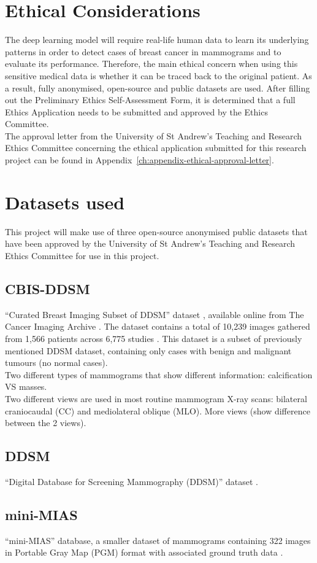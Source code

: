 \section{Ethical Considerations}

The deep learning model will require real-life human data to learn its underlying patterns in order to detect cases of breast cancer in mammograms and to evaluate its performance. Therefore, the main ethical concern when using this sensitive medical data is whether it can be traced back to the original patient. As a result, fully anonymised, open-source and public datasets are used. After filling out the Preliminary Ethics Self-Assessment Form, it is determined that a full Ethics Application needs to be submitted and approved by the Ethics Committee.\\

The approval letter from the University of St Andrew's Teaching and Research Ethics Committee concerning the ethical application submitted for this research project can be found in Appendix~\ref{ch:appendix-ethical-approval-letter}.


\section{Datasets used}

This project will make use of three open-source anonymised public datasets that have been approved by the University of St Andrew's Teaching and Research Ethics Committee for use in this project.

\subsection{CBIS-DDSM}

``Curated Breast Imaging Subset of DDSM'' dataset \cite{Lee2017}, available online from The Cancer Imaging Archive \cite{Clark2013}. The dataset contains a total of 10,239 images gathered from 1,566 patients across 6,775 studies \cite{Lee2017}. This dataset is a subset of previously mentioned DDSM dataset, containing only cases with benign and malignant tumours (no normal cases).\\

Two different types of mammograms that show different information: calcification VS masses.\\

Two different views are used in most routine mammogram X-ray scans: bilateral craniocaudal (CC) and mediolateral oblique (MLO). More views 
(show difference between the 2 views).

\subsection{DDSM}

``Digital Database for Screening Mammography (DDSM)'' dataset \cite{DDSMdataset2001}.

\subsection{mini-MIAS}

``mini-MIAS'' database, a smaller dataset of mammograms containing 322 images in Portable Gray Map (PGM) format with associated ground truth data \cite{Suckling1994}.